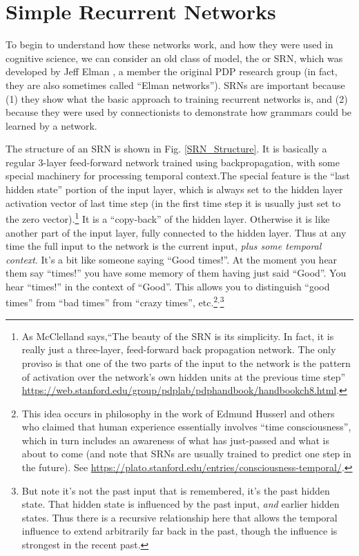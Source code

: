 \section{Simple Recurrent Networks}

To begin to understand how these networks work, and how they were used in cognitive science, we can consider an old class of model, the  or SRN, which was developed by Jeff Elman \cite{elman1990finding}, a member the original PDP research group  (in fact, they are also sometimes called ``Elman networks''). SRNs are important because (1) they show what the basic approach to training recurrent networks is, and (2) because they were used by connectionists to demonstrate how grammars could be learned by a network. 

The structure of an SRN is shown in Fig. \ref{SRN_Structure}. It is basically a regular 3-layer feed-forward network trained using backpropagation, with some special machinery for processing temporal context.The special feature is the ``last hidden state'' portion of the input layer, which is always set to the hidden layer activation vector of last time step (in the first time step it is usually just set to the  zero vector).\footnote{ As McClelland says,``The beauty of the SRN is its simplicity. In fact, it is really just a three-layer, feed-forward back propagation network. The only proviso is that one of the two parts of the input to the network is the pattern of activation over the network's own hidden units at the previous time step'' \url{ https://web.stanford.edu/group/pdplab/pdphandbook/handbookch8.html}.} It is a ``copy-back'' of the hidden  layer. Otherwise it is like another part of the input layer, fully connected to the hidden layer. Thus at any time the full input to the network is the current input, \emph{plus some temporal context}. It's a bit like  someone saying ``Good times!''. At the moment you hear them say ``times!'' you have some memory of them having just said ``Good''. You  hear ``times!'' in the context of ``Good''. This allows you to distinguish ``good times'' from ``bad times'' from ``crazy times'', etc.\footnote{This idea occurs in philosophy in the work of Edmund Husserl and others who claimed that human experience essentially involves ``time consciousness'', which in turn includes an awareness of what has just-passed and what is about to come (and note that SRNs are usually trained to predict one step in the future). See \url{https://plato.stanford.edu/entries/consciousness-temporal/}.}$^,$\footnote{But note it's not the past input that is remembered, it's the past  hidden state. That hidden state is influenced by the past  input, \emph{and} earlier hidden states. Thus there is a recursive relationship here that allows the temporal influence to extend arbitrarily far back in the past, though the influence is strongest in the recent past.}

